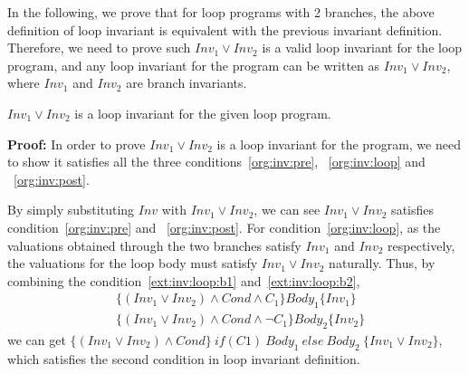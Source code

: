 In the following, we prove that for loop programs with 2 branches, 
the above definition of loop invariant is equivalent with the previous invariant definition.
Therefore, we need to prove such $Inv_1 \vee Inv_2$ is a valid loop invariant for the loop program,
and any loop invariant for the program can be written as $Inv_1 \vee Inv_2$, where $Inv_1$ and $Inv_2$ are branch invariants.


\begin{theorem}
\label{thm:disjunctive:is:invariant}
	$Inv_1 \vee Inv_2$ is a loop invariant for the given loop program.
\end{theorem}

\noindent \textbf{Proof:} In order to prove $Inv_1 \vee Inv_2$ is a loop invariant for the program,
we need to show it satisfies all the three conditions~\ref{org:inv:pre}, ~\ref{org:inv:loop} and ~\ref{org:inv:post}.

By simply substituting $Inv$ with  $Inv_1 \vee Inv_2$,
we can see $Inv_1 \vee Inv_2$ satisfies condition~\ref{org:inv:pre} and ~\ref{org:inv:post}.
For condition~\ref{org:inv:loop},
as the valuations obtained through the two branches satisfy $Inv_1$ and $Inv_2$ respectively, 
the valuations for the loop body must satisfy $Inv_1 \vee Inv_2$ naturally.
Thus, by combining the condition~\ref{ext:inv:loop:b1} and~\ref{ext:inv:loop:b2},
\begin{align*}
&\{(Inv_1 \vee Inv_2) \wedge Cond \wedge C_1\} Body_1 \{Inv_1\} \\
&\{(Inv_1 \vee Inv_2) \wedge Cond \wedge \neg C_1\} Body_2 \{Inv_2\}
\end{align*}
we can get $\{(Inv_1 \vee Inv_2) \wedge Cond\}~if (C1)~{Body_1}~else~{Body_2}~\{Inv_1 \vee Inv_2\}$,
which satisfies the second condition in loop invariant definition.

